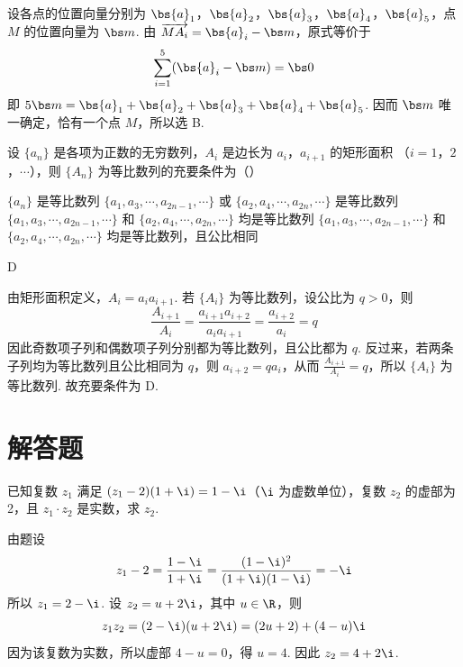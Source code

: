 \begin{solution}
设各点的位置向量分别为 \(\bs{a}_1\)，\(\bs{a}_2\)，\(\bs{a}_3\)，\(\bs{a}_4\)，\(\bs{a}_5\)，点 \(M\) 的位置向量为 \(\bs m\). 由 \(\overrightarrow{MA_i}=\bs{a}_i-\bs m\)，原式等价于
\[
\sum_{i=1}^{5}(\bs{a}_i-\bs m)=\bs0
\]
即 \(5\bs m=\bs{a}_1+\bs{a}_2+\bs{a}_3+\bs{a}_4+\bs{a}_5\). 因而 \(\bs m\) 唯一确定，恰有一个点 \(M\)，所以选 B.
\end{solution}

\begin{problem}
设 \(\{a_n\}\) 是各项为正数的无穷数列，\(A_i\) 是边长为 \(a_i\)，\(a_{i+1}\) 的矩形面积 （\(i = 1\)，\(2\)，\(\cdots\)），则 \(\{A_n\}\) 为等比数列的充要条件为（\quad）

\choices
    {\(\{a_n\}\) 是等比数列}
    {\(\{a_1, a_3, \cdots, a_{2n-1}, \cdots\}\) 或 \(\{a_2, a_4, \cdots, a_{2n}, \cdots\}\) 是等比数列}
    {\(\{a_1, a_3, \cdots, a_{2n-1}, \cdots\}\) 和 \(\{a_2, a_4, \cdots, a_{2n}, \cdots\}\) 均是等比数列}
    {\(\{a_1, a_3, \cdots, a_{2n-1}, \cdots\}\) 和 \(\{a_2, a_4, \cdots, a_{2n}, \cdots\}\) 均是等比数列，且公比相同}
\end{problem}

\begin{answer}
D
\end{answer}

\begin{solution}
由矩形面积定义，\(A_i=a_i a_{i+1}\). 若 \(\{A_i\}\) 为等比数列，设公比为 \(q>0\)，则
\[
\frac{A_{i+1}}{A_i}=\frac{a_{i+1}a_{i+2}}{a_i a_{i+1}}=\frac{a_{i+2}}{a_i}=q
\]
因此奇数项子列和偶数项子列分别都为等比数列，且公比都为 \(q\). 反过来，若两条子列均为等比数列且公比相同为 \(q\)，则 \(a_{i+2}=q a_i\)，从而 \(\frac{A_{i+1}}{A_i}=q\)，所以 \(\{A_i\}\) 为等比数列. 故充要条件为 D.
\end{solution}

\section{解答题}

\begin{problem}
已知复数 \(z_1\) 满足 \((z_1 - 2)(1 + \i) = 1 - \i\)（\(\i\) 为虚数单位），复数 \(z_2\) 的虚部为 2，且 \(z_1 \cdot z_2\) 是实数，求 \(z_2\).
\end{problem}

\begin{solution}
由题设
\[
z_1-2=\frac{1-\i}{1+\i}=\frac{(1-\i)^2}{(1+\i)(1-\i)}=-\i
\]
所以 \(z_1=2-\i\). 设 \(z_2=u+2\i\)，其中 \(u\in\R\)，则
\[
z_1z_2=(2-\i)(u+2\i)=(2u+2)+(4-u)\i
\]
因为该复数为实数，所以虚部 \(4-u=0\)，得 \(u=4\). 因此 \(z_2=4+2\i\).
\end{solution}

